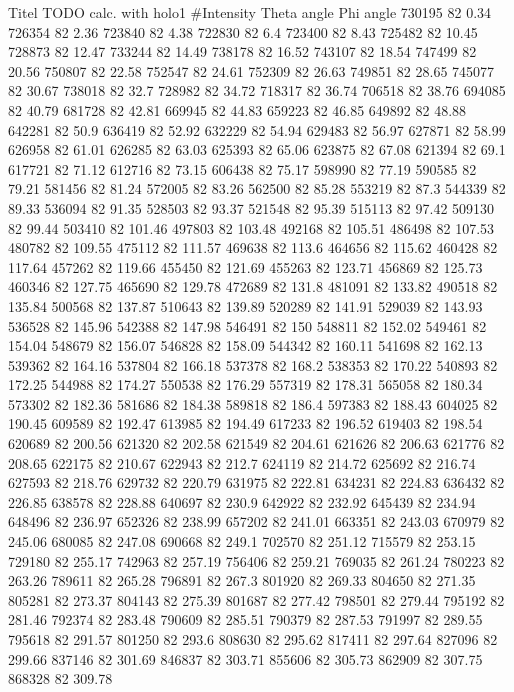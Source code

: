 Titel TODO
calc. with holo1
#Intensity    Theta angle    Phi angle
730195 82 0.34
726354 82 2.36
723840 82 4.38
722830 82 6.4
723400 82 8.43
725482 82 10.45
728873 82 12.47
733244 82 14.49
738178 82 16.52
743107 82 18.54
747499 82 20.56
750807 82 22.58
752547 82 24.61
752309 82 26.63
749851 82 28.65
745077 82 30.67
738018 82 32.7
728982 82 34.72
718317 82 36.74
706518 82 38.76
694085 82 40.79
681728 82 42.81
669945 82 44.83
659223 82 46.85
649892 82 48.88
642281 82 50.9
636419 82 52.92
632229 82 54.94
629483 82 56.97
627871 82 58.99
626958 82 61.01
626285 82 63.03
625393 82 65.06
623875 82 67.08
621394 82 69.1
617721 82 71.12
612716 82 73.15
606438 82 75.17
598990 82 77.19
590585 82 79.21
581456 82 81.24
572005 82 83.26
562500 82 85.28
553219 82 87.3
544339 82 89.33
536094 82 91.35
528503 82 93.37
521548 82 95.39
515113 82 97.42
509130 82 99.44
503410 82 101.46
497803 82 103.48
492168 82 105.51
486498 82 107.53
480782 82 109.55
475112 82 111.57
469638 82 113.6
464656 82 115.62
460428 82 117.64
457262 82 119.66
455450 82 121.69
455263 82 123.71
456869 82 125.73
460346 82 127.75
465690 82 129.78
472689 82 131.8
481091 82 133.82
490518 82 135.84
500568 82 137.87
510643 82 139.89
520289 82 141.91
529039 82 143.93
536528 82 145.96
542388 82 147.98
546491 82 150
548811 82 152.02
549461 82 154.04
548679 82 156.07
546828 82 158.09
544342 82 160.11
541698 82 162.13
539362 82 164.16
537804 82 166.18
537378 82 168.2
538353 82 170.22
540893 82 172.25
544988 82 174.27
550538 82 176.29
557319 82 178.31
565058 82 180.34
573302 82 182.36
581686 82 184.38
589818 82 186.4
597383 82 188.43
604025 82 190.45
609589 82 192.47
613985 82 194.49
617233 82 196.52
619403 82 198.54
620689 82 200.56
621320 82 202.58
621549 82 204.61
621626 82 206.63
621776 82 208.65
622175 82 210.67
622943 82 212.7
624119 82 214.72
625692 82 216.74
627593 82 218.76
629732 82 220.79
631975 82 222.81
634231 82 224.83
636432 82 226.85
638578 82 228.88
640697 82 230.9
642922 82 232.92
645439 82 234.94
648496 82 236.97
652326 82 238.99
657202 82 241.01
663351 82 243.03
670979 82 245.06
680085 82 247.08
690668 82 249.1
702570 82 251.12
715579 82 253.15
729180 82 255.17
742963 82 257.19
756406 82 259.21
769035 82 261.24
780223 82 263.26
789611 82 265.28
796891 82 267.3
801920 82 269.33
804650 82 271.35
805281 82 273.37
804143 82 275.39
801687 82 277.42
798501 82 279.44
795192 82 281.46
792374 82 283.48
790609 82 285.51
790379 82 287.53
791997 82 289.55
795618 82 291.57
801250 82 293.6
808630 82 295.62
817411 82 297.64
827096 82 299.66
837146 82 301.69
846837 82 303.71
855606 82 305.73
862909 82 307.75
868328 82 309.78
